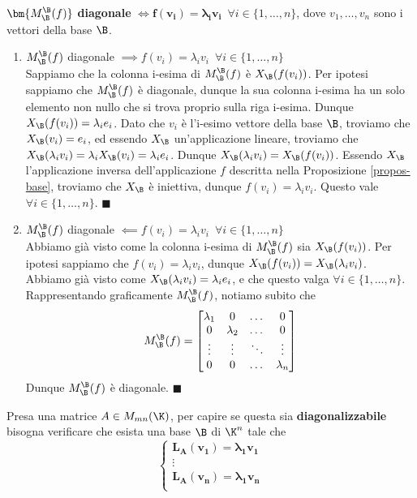 \documentclass[11pt, a4paper, titlepage, oneside]{scrbook}
\begin{document}
\begin{Osservazione}[]
\label{oss-matrice-diagonale-f(vi)= lambda i vi}
$\bm{M_\B^\B(f)}$ \textbf{diagonale}  $\iff \bm{f(v_i) = \lambda_i v_i} \enspace \forall i \in \{1, \ldots, n\}$, dove $v_1, \ldots, v_n$ sono i vettori della base $\B$.  
\end{Osservazione}

\Dimostrazione \nopagebreak

\begin{enumerate}[label=\arabic*°]
    \item $M_\B^\B(f)$ diagonale $\implies f(v_i) = \lambda_i v_i \enspace \forall i \in \{1, \ldots, n\}$\\
    Sappiamo che la colonna i-esima di $M_\B^\B(f)$ è $X_\B(f(v_i))$. Per ipotesi sappiamo che $M_\B^\B(f)$ è diagonale, dunque la sua colonna i-esima ha un solo elemento non nullo che si trova proprio sulla riga i-esima. Dunque $X_\B(f(v_i)) = \lambda_i e_i$. Dato che $v_i$ è l'i-esimo vettore della base $\B$, troviamo che $X_\B(v_i) = e_i$, ed essendo $X_\B$ un'applicazione lineare, troviamo che $X_\B(\lambda_i v_i) = \lambda_i X_\B(v_i) = \lambda_i e_i$. Dunque $X_\B(\lambda_i v_i) = X_\B(f(v_i))$. Essendo $X_\B$ l'applicazione inversa dell'applicazione $f$ descritta nella Proposizione \ref{propos-base}, troviamo che $X_\B$ è iniettiva, dunque $f(v_i) = \lambda_i v_i$. Questo vale $\forall i \in \{1, \ldots, n\}$. $\blacksquare$
    \item $M_\B^\B(f)$ diagonale $\impliedby f(v_i) = \lambda_i v_i \enspace \forall i \in \{1, \ldots, n\}$\\
    Abbiamo già visto come la colonna i-esima di $M_\B^\B(f)$ sia $X_\B(f(v_i))$. Per ipotesi sappiamo che $f(v_i) = \lambda_i v_i$, dunque $X_\B(f(v_i)) = X_\B(\lambda_i v_i)$. Abbiamo già visto come $X_\B(\lambda_i v_i) = \lambda_i e_i$, e che questo valga $\forall i \in \{1, \ldots, n\}$. Rappresentando graficamente $M_\B^\B(f)$, notiamo subito che 
    \[
    M_\B^\B(f) = \begin{bmatrix}
        \lambda_1 & 0 & \dots & 0 \\
        0 & \lambda_2 & \dots & 0 \\
        \vdots & \vdots & \ddots & \vdots \\
        0 & 0 & \dots & \lambda_n
    \end{bmatrix}
    \]
    Dunque $M_\B^\B(f)$ è diagonale. $\blacksquare$
\end{enumerate}

\begin{Proposizione}[Corollario]
\label{corol-capire-matrice-diagonalizzabile}
Presa una matrice $A \in M_{mn}(\K)$, per capire se questa sia \textbf{diagonalizzabile} bisogna verificare che esista una base $\B$ di $\K^n$ tale che 
\[
\begin{cases}
\bm{L_A(v_1) = \lambda_1 v_1} \\
\vdots \\
\bm{L_A(v_n) = \lambda_1 v_n} \\
\end{cases}
\]
\end{Proposizione}
\end{document}
